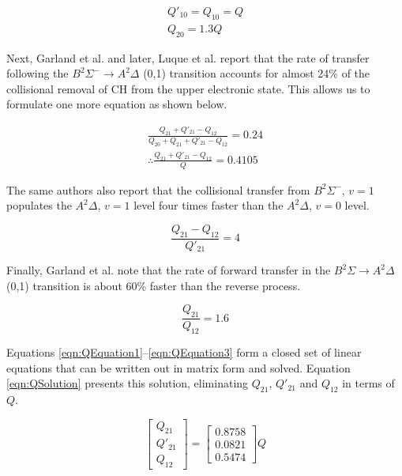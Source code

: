 \begin{gather}
  Q'_{10} = Q_{10} = Q \nonumber \\
  Q_{20} = 1.3 Q
  \label{eqn:quenchingAssumption}
\end{gather}

Next, Garland et al.\cite{1985-garland-b} and later, Luque et al.\cite{2000-luque} report that the rate of transfer following the \(B^2\Sigma^-\rightarrow A^2\Delta\) (0,1) transition accounts for almost 24\% of the collisional removal of CH from the upper electronic state.
This allows us to formulate one more equation as shown below.

\begin{gather}
  \frac{ Q_{21} + Q'_{21} - Q_{12} }{ Q_{20} + Q_{21} + Q'_{21} - Q_{12} } = 0.24 \nonumber \\
  \therefore \frac{ Q_{21} + Q'_{21} - Q_{12} }{ Q } = 0.4105
  \label{eqn:QEquation1}
\end{gather}

The same authors also report that the collisional transfer from \(B^2\Sigma^-\), \(v = 1\) populates the \(A^2\Delta\), \(v = 1\) level four times faster than the \(A^2\Delta\), \(v = 0\) level.

\begin{equation}
  \frac{ Q_{21} - Q_{12} }{ Q'_{21} } = 4
  \label{eqn:QEquation2}
\end{equation}

Finally, Garland et al.\cite{1985-garland-b} note that the rate of forward transfer in the \(B^2\Sigma\rightarrow A^2\Delta\) (0,1) transition is about 60\% faster than the reverse process.

\begin{equation}
  \frac{Q_{21}}{Q_{12}} = 1.6
  \label{eqn:QEquation3}
\end{equation}

Equations \ref{eqn:QEquation1}--\ref{eqn:QEquation3} form a closed set of linear equations that can be written out in matrix form and solved.
Equation \ref{eqn:QSolution} presents this solution, eliminating \(Q_{21}\), \(Q'_{21}\) and \(Q_{12}\) in terms of \(Q\).

\begin{equation}
  \left[
    \begin{matrix}
      Q_{21}\\
      Q'_{21}\\
      Q_{12}
    \end{matrix}
  \right] = \left[
   \begin{matrix}
      0.8758\\
      0.0821\\
      0.5474
    \end{matrix}
  \right] Q
  \label{eqn:QSolution}
\end{equation}

